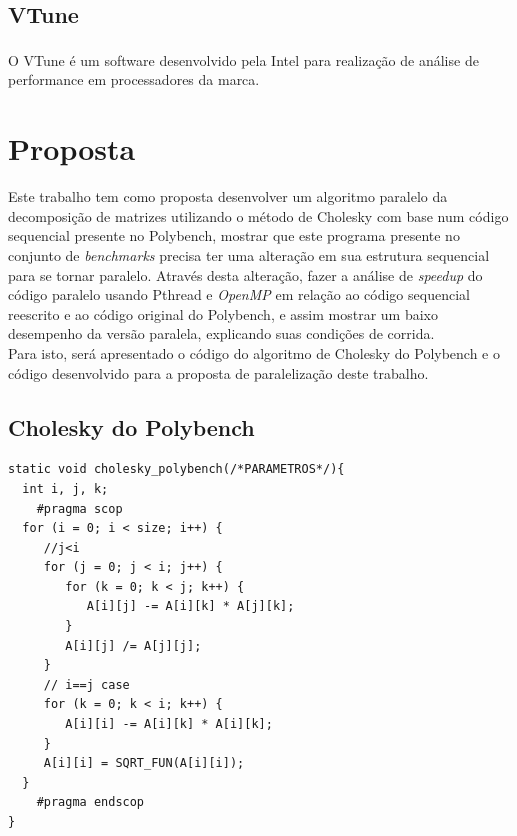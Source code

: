\documentclass[12pt]{article}
\newcommand\tab[1][1cm]{\hspace*{#1}}
\begin{document}
\subsection{VTune\textsuperscript{\texttrademark}}\label{subsubsec:vtune}
\tab O VTune\textsuperscript{\texttrademark} é um software desenvolvido pela Intel\textsuperscript{\textregistered} para realização de análise de performance em processadores da marca.

\section{Proposta}\label{sec:prop}
\tab Este trabalho tem como proposta desenvolver um algoritmo paralelo da decomposição de matrizes utilizando o método de Cholesky com base num código sequencial presente no Polybench, mostrar que este programa presente no conjunto de \textit{benchmarks} precisa ter uma alteração em sua estrutura sequencial para se tornar paralelo. Através desta alteração, fazer a análise de \textit{speedup} do código paralelo usando Pthread e \textit{OpenMP} em relação ao código sequencial reescrito e ao código original do Polybench, e assim mostrar um baixo desempenho da versão paralela, explicando suas condições de corrida.
\\
\tab Para isto, será apresentado o código do  algoritmo de Cholesky do   Polybench e o código desenvolvido para a proposta de paralelização deste trabalho.
\subsection{Cholesky do Polybench}\label{subsec:polycholesky}
\begin{lstlisting}[style=CStyle]
static void cholesky_polybench(/*PARAMETROS*/){
  int i, j, k;
	#pragma scop
  for (i = 0; i < size; i++) {
     //j<i
     for (j = 0; j < i; j++) {
        for (k = 0; k < j; k++) {
           A[i][j] -= A[i][k] * A[j][k];
        }
        A[i][j] /= A[j][j];
     }
     // i==j case
     for (k = 0; k < i; k++) {
        A[i][i] -= A[i][k] * A[i][k];
     }
     A[i][i] = SQRT_FUN(A[i][i]);
  }
	#pragma endscop
}
\end{lstlisting}
\end{document}
